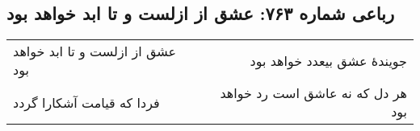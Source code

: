 \begin{center}
\section*{رباعی شماره ۷۶۳: عشق از ازلست و تا ابد خواهد بود}
\label{sec:0763}
\begin{longtable}{l p{0.5cm} r}
عشق از ازلست و تا ابد خواهد بود
&&
جویندهٔ عشق بیعدد خواهد بود
\\
فردا که قیامت آشکارا گردد
&&
هر دل که نه عاشق است رد خواهد بود
\\
\end{longtable}
\end{center}
